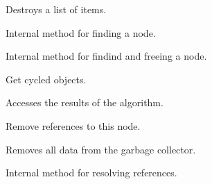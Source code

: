 Destroys a list of items.


\label{garbagecollectorfinditemnode}


Internal method for finding a node.


\label{garbagecollectorfindreferencefreeitemnode}


Internal method for findind and freeing a node.


\label{garbagecollectorgetcycledobjects}


Get cycled objects.


\label{garbagecollectorgetregularobjects}


Accesses the results of the algorithm.


\label{garbagecollectorremovereferencestonode}


Remove references to this node.


\label{garbagecollectorreset}


Removes all data from the garbage collector.


\label{garbagecollectorresolvereferences}


Internal method for resolving references.

